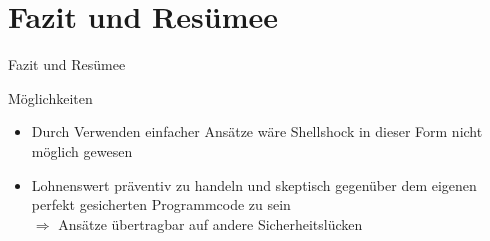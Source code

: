 \documentclass[handout]{beamer}
\begin{document}




\section[Fazit]{Fazit und Resümee}
\begin{frame}{Fazit und Resümee}
\begin{block}{Möglichkeiten}
\begin{itemize}[<+->]
\item Durch Verwenden einfacher Ansätze wäre Shellshock in dieser Form nicht möglich gewesen
\item Lohnenswert präventiv zu handeln und skeptisch gegenüber dem eigenen perfekt gesicherten Programmcode zu sein \\
$\Rightarrow$ Ansätze übertragbar auf andere Sicherheitslücken
\end{itemize}
\end{block}
\end{frame}
\end{document}
